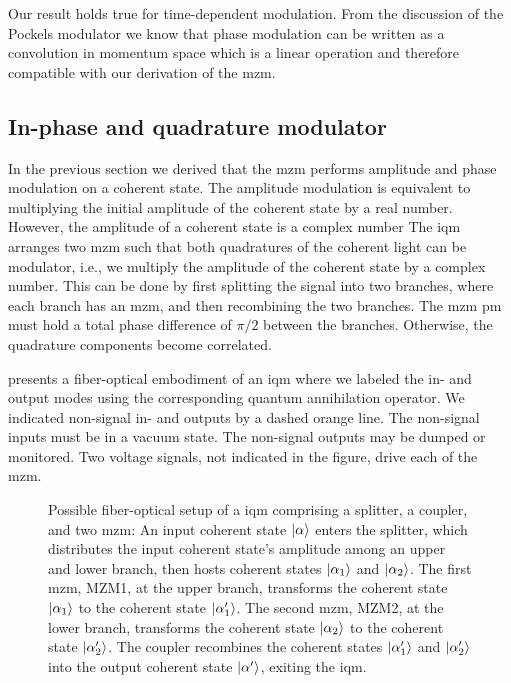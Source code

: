 Our result holds true for time-dependent modulation.
From the discussion of the Pockels modulator we know that phase modulation can be written as a convolution in momentum space which is a linear operation and therefore compatible with our derivation of the \gls{mzm}.

\subsection{In-phase and quadrature modulator}

In the previous section we derived that the \gls{mzm} performs amplitude and phase modulation on a coherent state.
The amplitude modulation is equivalent to multiplying the initial amplitude of the coherent state by a real number.
However, the amplitude of a coherent state is a complex number
The \gls{iqm} arranges two \gls{mzm} such that both quadratures of the coherent light can be modulator, i.e., we multiply the amplitude of the coherent state by a complex number.
This can be done by first splitting the signal into two branches, where each branch has an \gls{mzm}, and then recombining the two branches.
The \gls{mzm} \gls{pm} must hold a total phase difference of $\pi/2$ between the branches.
Otherwise, the quadrature components become correlated.

 presents a fiber-optical embodiment of an \gls{iqm} where we labeled the in- and output modes using the corresponding quantum annihilation operator.
We indicated non-signal in- and outputs by a dashed orange line.
The non-signal inputs must be in a vacuum state.
The non-signal outputs may be dumped or monitored.
Two voltage signals, not indicated in the figure, drive each of the \gls{mzm}.
\begin{figure}[htb]
	\centering
	
	\caption{Possible fiber-optical setup of a \gls{iqm} comprising a splitter, a coupler, and two \gls{mzm}: An input coherent state $\ket{\alpha}$ enters the splitter, which distributes the input coherent state's amplitude among an upper and lower branch, then hosts coherent states $\ket{\alpha_1}$ and $\ket{\alpha_2}$. The first \gls{mzm}, MZM1, at the upper branch, transforms the coherent state $\ket{\alpha_1}$ to the coherent state $\ket{\alpha_1^\prime}$. The second \gls{mzm}, MZM2, at the lower branch, transforms the coherent state $\ket{\alpha_2}$ to the coherent state $\ket{\alpha_2^\prime}$. The coupler recombines the coherent states $\ket{\alpha_1^\prime}$ and $\ket{\alpha_2^\prime}$ into the output coherent state $\ket{\alpha^\prime}$, exiting the \gls{iqm}.}\label{fig:iqm}
\end{figure}

